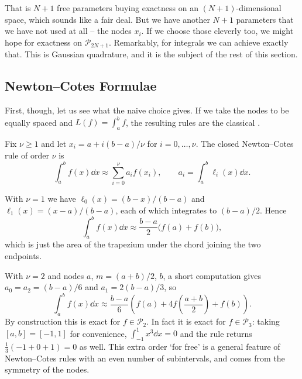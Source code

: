 \documentclass[a4paper]{scrartcl}
\newcommand{\Pn}[1]{\mathcal{P}_{#1}}
\begin{document}
That is $N+1$ free parameters buying exactness on an $(N+1)$-dimensional space, which sounds like a fair deal. But we have another $N+1$ parameters that we have not used at all -- the nodes $x_i$. If we choose those cleverly too, we might hope for exactness on $\Pn{2N+1}$. Remarkably, for integrals we can achieve exactly that. This is Gaussian quadrature, and it is the subject of the rest of this section.

\subsection{Newton--Cotes Formulae}

First, though, let us see what the naive choice gives. If we take the nodes to be equally spaced and $L(f) = \int_a^b f$, the resulting rules are the classical .

\begin{definition}
  Fix $\nu \ge 1$ and let $x_i = a + i(b-a)/\nu$ for $i = 0, \dots, \nu$. The closed Newton--Cotes rule of order $\nu$ is
  $$
  \int_a^b f(x)\dd x \approx \sum_{i=0}^{\nu} a_i f(x_i), \qquad a_i = \int_a^b \ell_i(x)\dd x .
  $$
\end{definition}

\begin{example}
  With $\nu = 1$ we have $\ell_0(x) = (b-x)/(b-a)$ and $\ell_1(x) = (x-a)/(b-a)$, each of which integrates to $(b-a)/2$. Hence
  $$
  \int_a^b f(x)\dd x \approx \frac{b-a}{2}\big(f(a) + f(b)\big),
  $$
  which is just the area of the trapezium under the chord joining the two endpoints.
\end{example}

\begin{example}
  With $\nu = 2$ and nodes $a$, $m = (a+b)/2$, $b$, a short computation gives $a_0 = a_2 = (b-a)/6$ and $a_1 = 2(b-a)/3$, so
  $$
  \int_a^b f(x)\dd x \approx \frac{b-a}{6}\left(f(a) + 4f\left(\frac{a+b}{2}\right) + f(b)\right).
  $$
  By construction this is exact for $f \in \Pn{2}$. In fact it is exact for $f \in \Pn{3}$: taking $[a,b] = [-1,1]$ for convenience, $\int_{-1}^1 x^3 \dd x = 0$ and the rule returns $\tfrac13(-1 + 0 + 1) = 0$ as well. This extra order `for free' is a general feature of Newton--Cotes rules with an even number of subintervals, and comes from the symmetry of the nodes.
\end{example}
\end{document}
